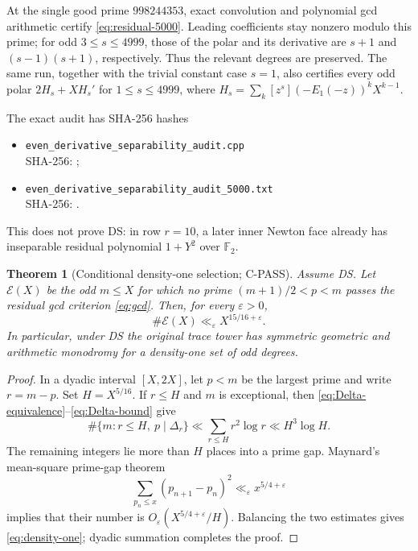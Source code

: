 \documentclass[11pt]{article}
\theoremstyle{keio}
\newtheorem{theorem}{Theorem}[section]
\theoremstyle{definition}
\theoremstyle{remark}
\newcommand{\F}{\mathbb F}
\newcommand{\CPASS}{\textcolor{keioviolet}{\textsf{C-PASS}}}
\begin{document}
At the single good prime $998244353$, exact convolution and polynomial gcd
arithmetic certify \eqref{eq:residual-5000}. Leading coefficients stay
nonzero modulo this prime; for odd $3\le s\le4999$, those of the polar and
its derivative are $s+1$ and $(s-1)(s+1)$, respectively. Thus the relevant
degrees are preserved. The same run, together with the trivial constant
case $s=1$, also certifies every odd polar $2H_s+XH_s'$ for
$1\le s\le4999$, where
$H_s=\sum_k[z^s](-E_1(-z))^kX^{k-1}$.

The exact audit has SHA-256 hashes
\begin{itemize}
\item \nolinkurl{even_derivative_separability_audit.cpp}\\[-.15em]
\textcolor{bluegray}{\small SHA-256: }
\texttt{\small{}};
\item \nolinkurl{even_derivative_separability_audit_5000.txt}\\[-.15em]
\textcolor{bluegray}{\small SHA-256: }
\texttt{\small{}}.
\end{itemize}
This does not prove DS: in row $r=10$, a later inner Newton face already
has inseparable residual polynomial $1+Y^2$ over $\F_2$.

\begin{theorem}[Conditional density-one selection; \CPASS]\label{thm:density-one}
Assume DS. Let $\mathcal E(X)$ be the odd $m\le X$ for which no prime
$(m+1)/2<p<m$ passes the residual gcd criterion \eqref{eq:gcd}. Then, for
every $\varepsilon>0$,
\begin{equation}
\boxed{\#\mathcal E(X)\ll_\varepsilon X^{15/16+\varepsilon}.}
\label{eq:density-one}
\end{equation}
In particular, under DS the original trace tower has symmetric geometric
and arithmetic monodromy for a density-one set of odd degrees.
\end{theorem}

\begin{proof}
In a dyadic interval $[X,2X]$, let $p<m$ be the largest prime and write
$r=m-p$. Set $H=X^{5/16}$. If $r\le H$ and $m$ is exceptional, then
\eqref{eq:Delta-equivalence}--\eqref{eq:Delta-bound} give
\[
\#\{m:r\le H,\ p\mid\Delta_r\}
\ll\sum_{r\le H}r^2\log r
\ll H^3\log H.
\]
The remaining integers lie more than $H$ places into a prime gap. Maynard's
mean-square prime-gap theorem \cite[Theorem~3.1]{Maynard2012}
\[
\sum_{p_n\le x}(p_{n+1}-p_n)^2
\ll_\varepsilon x^{5/4+\varepsilon}
\]
implies that their number is
$O_\varepsilon(X^{5/4+\varepsilon}/H)$. Balancing the two estimates gives
\eqref{eq:density-one}; dyadic summation completes the proof.
\end{proof}
\end{document}
